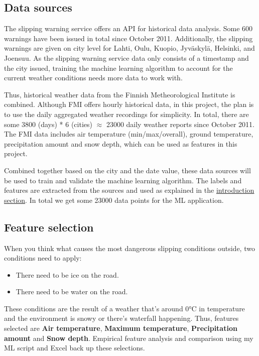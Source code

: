 \documentclass[12pt, a4paper]{report}
\begin{document}
    \subsection{Data sources}
    The slipping warning service offers an API \cite{warnsource} for historical data analysis. Some 600 warnings have been issued in total since October 2011.
    Additionally, the slipping warnings are given on city level for Lahti, Oulu, Kuopio, Jyväskylä, Helsinki, and Joensuu.
    As the slipping warning service data only consists of a timestamp and the city issued, training the machine learning algorithm to account for the current weather conditions needs more data to work with.

    Thus, historical weather data from the Finnish Metheorological Institute \cite{fmisource}
    is combined. Although FMI offers hourly historical data, in this project, the plan is to use the daily aggregated weather recordings for simplicity.
    In total, there are some 3800 (days) * 6 (cities) $\approx$ 23000 daily weather reports since October 2011.
    The FMI data includes air temperature (min/max/overall), ground temperature, precipitation amount and snow depth, which can be used as features in this project.

    Combined together based on the city and the date value, these data sources will be used to train and validate the machine learning algorithm. 
    The labels and features are extracted from the sources and used as explained in the \hyperlink{section.0.1.1}{introduction section}. 
    In total we get some 23000 data points for the ML application.

    \subsection{Feature selection}
    When you think what causes the most dangerous slipping conditions outside, two conditions need to apply:
    \begin{itemize}
      \item There need to be ice on the road.
      \item There need to be water on the road.
    \end{itemize}
    These conditions are the result of a weather that's around 0°C in temperature and the environment is snowy or there's waterfall happening.
    Thus, features selected are \textbf{Air temperature}, \textbf{Maximum temperature}, \textbf{Precipitation amount} and \textbf{Snow depth}. Empirical feature analysis 
    and comparison using my ML script and Excel back up these selections. 
\end{document}
